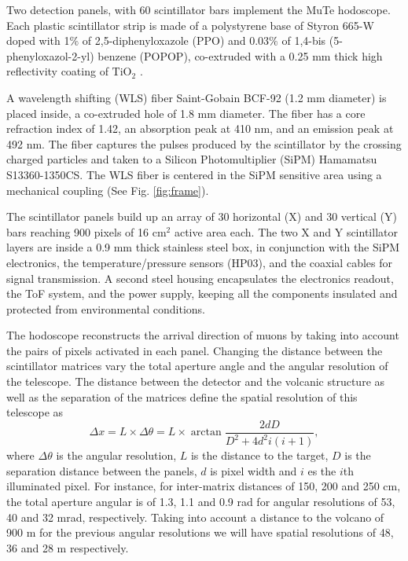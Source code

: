 \documentclass[letterpaper,11pt]{article}
\begin{document}
Two detection panels, with 60 scintillator bars implement the MuTe hodoscope. Each plastic scintillator strip is made of a polystyrene base of Styron 665-W doped with 1$\%$ of 2,5-diphenyloxazole (PPO) and 0.03$\%$ of 1,4-bis (5-phenyloxazol-2-yl) benzene (POPOP), co-extruded with a 0.25 mm thick high reflectivity coating of $\text{TiO}_{\text{2}}$ \cite{PlaDalmau2003}. 

A wavelength shifting (WLS) fiber Saint-Gobain BCF-92 (1.2 mm diameter) is placed inside, a co-extruded hole of 1.8 mm diameter. The fiber has a core refraction index of 1.42, an absorption peak at 410 nm, and an emission peak at 492 nm. The fiber captures the pulses produced by the scintillator by the crossing charged particles and taken to a Silicon Photomultiplier (SiPM) Hamamatsu S13360-1350CS. The WLS fiber is centered in the SiPM sensitive area using a mechanical coupling (See Fig. \ref{fig:frame}). 

The scintillator panels build up an array of 30 horizontal (X) and 30 vertical (Y) bars reaching 900 pixels of 16 cm$^2$ active area each. The two X and Y scintillator layers are inside a 0.9 mm thick stainless steel box, in conjunction with the SiPM electronics, the temperature/pressure sensors (HP03), and the coaxial cables for signal transmission. A second steel housing encapsulates the electronics readout, the ToF system, and the power supply, keeping all the components insulated and protected from environmental conditions. 

The hodoscope reconstructs the arrival direction of muons by taking into account the pairs of pixels activated in each panel. Changing the distance between the scintillator matrices vary the total aperture angle and the angular resolution of the telescope. The distance between the detector and the volcanic structure as well as the separation of the matrices define the spatial resolution of this telescope as
\begin{equation}
\Delta x=L\times\Delta\theta=L\times \arctan{\frac{2dD}{D^2+4d^2i(i+1)}},
\end{equation}
where $\Delta\theta$ is the angular resolution, $L$ is the distance to the target, $D$ is the separation distance between the panels, $d$ is pixel width and $i$ es the $i$th illuminated pixel. For instance, for inter-matrix distances of 150, 200 and 250 cm, the total aperture angular is of 1.3, 1.1 and 0.9 rad for angular resolutions of 53, 40 and 32 mrad, respectively. Taking into account a distance to the volcano of 900 m for the previous angular resolutions we will have spatial resolutions of 48, 36 and 28 m respectively.
\end{document}
